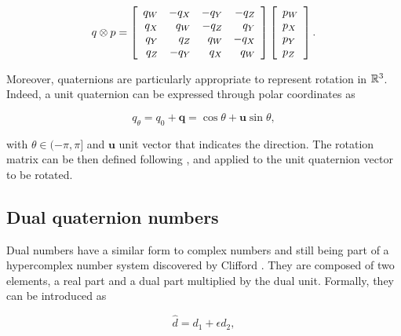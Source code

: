 \documentclass[3p, preprint, twocolumn]{elsarticle}
\begin{document}
\begin{equation}
\label{eq:qprod}
    q \otimes p = \left[ {\begin{array}{*{20}c}
   \hfill {{q}_W } & \hfill { - {q}_X } & \hfill { - {q}_Y } & \hfill { - {q}_Z } \\
   \hfill {{q}_X } & \hfill {{q}_W } & \hfill { - {q}_Z } & \hfill {{q}_Y } \\
   \hfill {{q}_Y } & \hfill {{q}_Z } & \hfill {{q}_W } & \hfill { - {q}_X } \\
   \hfill {{q}_Z } & \hfill { - {q}_Y } & \hfill {{q}_X } & \hfill {{q}_W } \\
\end{array}} \right] \left[ {\begin{array}{*{20}c}
   {p_W } \hfill  \\
   {p_X } \hfill  \\
   {p_Y } \hfill  \\
   {p_Z } \hfill  \\
\end{array}} \right].
\end{equation}

Moreover, quaternions are particularly appropriate to represent rotation in $\mathbb{R}^3$. Indeed, a unit quaternion can be expressed through polar coordinates as 

\begin{equation}
\label{eq:qpolar}
    q_{\theta} = q_0 + \mathbf{q} = \cos\theta + \mathbf{u}\sin\theta,
\end{equation}

\noindent with $\theta \in (-\pi, \pi]$ and $\mathbf{u}$ unit vector that indicates the direction. The rotation matrix can be then defined following \cite{Kuipers1921book}, and applied to the unit quaternion vector to be rotated.


\subsection{Dual quaternion numbers}

Dual numbers have a similar form to complex numbers and still being part of a hypercomplex number system discovered by Clifford \cite{Clifford1871}. They are composed of two elements, a real part and a dual part multiplied by the dual unit. Formally, they can be introduced as

\begin{equation}
\label{eq:dualnum}
    \hat{d} = d_1 + \epsilon d_2,
\end{equation}
\end{document}
